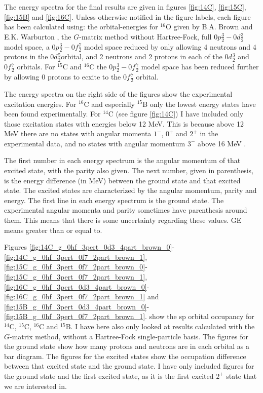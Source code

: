 


The energy spectra for the final results are given in figures \ref{fig:14C},
\ref{fig:15C}, \ref{fig:15B} and \ref{fig:16C}. Unless otherwise notified in
the figure labels, each figure has been calculated using: the orbital-energies
for $^{16}$O given by B.A. Brown and E.K. Warburton \citep{brown}, the
$G$-matrix method without Hartree-Fock, full $0p\frac32-0d\frac32$ model space,
a $0p\frac32-0f\frac72$ model space reduced by only allowing 4 neutrons and 4
protons in the $0d\frac52$orbital, and 2 neutrons and 2 protons in each of the
$0d\frac32$ and $0f\frac72$ orbitals. For $^{15}$C and $^{16}$C the
$0p\frac32-0f\frac72$ model space has been reduced further by allowing 0
protons to ecxite to the $0f\frac72$ orbital.

The energy spectra on the right side of the figures show the experimental
excitation energies. For $^{16}$C and especially $^{15}$B only the lowest
energy states have been found experimentally. For $^{14}$C (see figure
\ref{fig:14C}) I have included only those excitation states with energies below
12 MeV. This is because above 12 MeV there are no states with angular momenta
$1^-$, $0^+$ and $2^+$ in the experimental data, and no states with angular
momentum $3^-$ above 16 MeV \citep{nndc}.

The first number in each energy spectrum is the angular momentum of that
excited state, with the parity also given. The next number, given in
parenthesis, is the energy difference (in MeV) between the ground state and
that excited state. The excited states are characterized by the angular
momentum, parity and energy. The first line in each energy spectrum is the
ground state. The experimental angular momenta and parity sometimes have
parenthesis around them. This means that there is some uncertainty regarding
these values. GE means greater than or equal to.

Figures
\ref{fig:14C_g_0hf_3pert_0d3_4part_brown_0}-\ref{fig:14C_g_0hf_3pert_0f7_2part_brown_1},
\ref{fig:15C_g_0hf_3pert_0f7_2part_brown_0}-\ref{fig:15C_g_0hf_3pert_0f7_2part_brown_1},
\ref{fig:16C_g_0hf_3pert_0d3_4part_brown_0}-\ref{fig:16C_g_0hf_3pert_0f7_2part_brown_1}
and
\ref{fig:15B_g_0hf_3pert_0d3_4part_brown_0}-\ref{fig:15B_g_0hf_3pert_0f7_2part_brown_1}.
show the sp orbital occupancy for $^{14}$C, $^{15}$C, $^{16}$C and $^{15}$B. I
have here also only looked at results calculated with the $G$-matrix method,
without a Hartree-Fock single-particle basis. The figures for the ground state show how many protons
and neutrons are in each orbital as a bar diagram. The figures for the excited
states show the occupation difference between that excited state and the ground
state. I have only included figures for the ground state and the first excited
state, as it is the first excited $2^+$ state that we are interested in.

